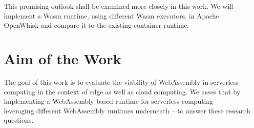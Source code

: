 
This promising outlook shall be examined more closely in this work. We will implement a Wasm runtime, using different Wasm executors, in Apache OpenWhisk and compare it to the existing container runtime.

\section{Aim of the Work}

The goal of this work is to evaluate the viability of WebAssembly in serverless computing in the context of edge as well as cloud computing. We asses that by implementing a WebAssembly-based runtime for serverless computing -- leveraging different WebAssembly runtimes underneath -- to answer these research questions.


